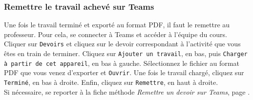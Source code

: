 \subsubsection{Remettre le travail achevé sur Teams}

Une fois le travail terminé et exporté au format PDF, il faut le remettre au professeur. Pour cela, se connecter à Teams et accéder à l'équipe du cours. Cliquer sur \texttt{Devoirs} et cliquez sur le devoir correspondant à l'activité que vous êtes en train de terminer. Cliquez sur \texttt{Ajouter un travail}, en bas, puis \texttt{Charger à partir de cet appareil}, en bas à gauche. Sélectionnez le fichier au format PDF que vous venez d'exporter et \texttt{Ouvrir}. Une fois le travail chargé, cliquez sur \texttt{Terminé}, en bas à droite. Enfin, cliquez sur \texttt{Remettre}, en haut à droite.\\



Si nécessaire, se reporter à la fiche méthode \emph{Remettre un devoir sur Teams}, page \pageref{TeamsRemettreDevoir}.



